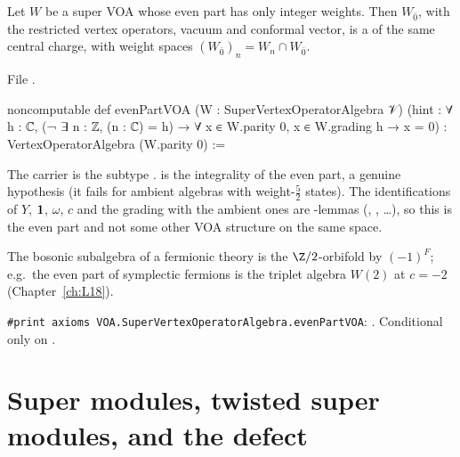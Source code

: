 \begin{theorem}\label{l17:thm:evenpart}
Let $W$ be a super VOA whose even part has only integer weights. Then $W_{\bar0}$, with the restricted
vertex operators, vacuum and conformal vector, is a  of the same central
charge, with weight spaces $(W_{\bar0})_n=W_n\cap W_{\bar0}$.
\end{theorem}
\noindent File .
\begin{leancode}
noncomputable def evenPartVOA (W : SuperVertexOperatorAlgebra 𝒱)
    (hint : ∀ h : ℂ, (¬ ∃ n : ℤ, (n : ℂ) = h) → ∀ x ∈ W.parity 0, x ∈ W.grading h → x = 0) :
    VertexOperatorAlgebra (W.parity 0) :=
\end{leancode}
\begin{dictionary}
The carrier is the subtype .  is the integrality of the even part, a
genuine hypothesis (it fails for ambient algebras with weight-$\frac52$ states). The identifications
of $Y$, $\mathbf{1}$, $\omega$, $c$ and the grading with the ambient ones are -lemmas
(, , \dots), so this is the even part and not some
other VOA structure on the same space.
\end{dictionary}
\begin{physics}
The bosonic subalgebra of a fermionic theory is the $\Z/2$-orbifold by $(-1)^F$; e.g.\ the even
part of symplectic fermions is the triplet algebra $W(2)$ at $c=-2$ (Chapter~\ref{ch:L18}).
\end{physics}
\begin{status}
\texttt{\#print axioms VOA.SuperVertexOperatorAlgebra.evenPartVOA}: . Conditional only on .
\end{status}

\section{Super modules, twisted super modules, and the defect}\label{l17:sec:modules}

